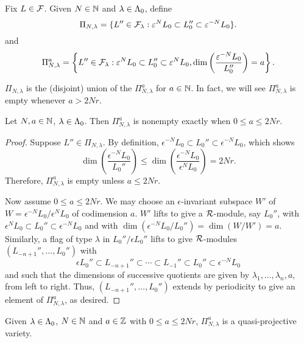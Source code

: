 \documentclass[a4paper, 11pt]{report}
\begin{document}
Fix $L\in\mathcal{F}$. Given $N\in\mathbb{N}$ and $\lambda\in{\Lambda_0}$, define
\begin{equation*}
\Pi_{N,\lambda} = \{L''\in\mathcal{F}_\lambda: \varepsilon^N L_0\subset L_0''\subset \varepsilon^{-N}L_0\}.
\end{equation*}
and
\begin{equation*}
\Pi_{N,\lambda}^a = \left\{L''\in\mathcal{F}_\lambda: \varepsilon^N L_0\subset L_0''\subset \varepsilon^{N}L_0, \dim\left(\frac{\varepsilon^{-N}L_0}{L_0''}\right) = a\right\}.
\end{equation*}

$\Pi_{N,\lambda}$ is the (disjoint) union of the $\Pi_{N,\lambda}^a$ for $a\in\mathbb{N}$. In fact, we will see $\Pi_{N,\lambda}^a$ is empty whenever $a > 2Nr$.

\begin{lemma}
Let $N,a\in\mathbb{N}$, $\lambda\in{\Lambda_0}$. Then $\Pi_{N,\lambda}
^a$ is nonempty exactly when $0\le a \le 2Nr$.
\end{lemma}

\begin{proof}
Suppose $L''\in\Pi_{N,\lambda}$. By definition, $\epsilon^{-N}L_0\subset L_0''\subset \epsilon^{-N}L_0$, which shows
\begin{equation*}
\dim\left(\frac{\epsilon^{-N}L_0}{L_0''}\right) \le \dim\left(\frac{\epsilon^{-N}L_0}{\epsilon^N L_0}\right) = 2Nr.
\end{equation*}
Therefore, $\Pi_{N,\lambda}^a$ is empty unless $a\le 2Nr$.

Now assume $0\le a\le 2Nr$. We may choose an $\epsilon$-invariant subspace $W'$ of $W = \epsilon^{-N}L_0/{\epsilon^N L_0}$ of codimension $a$. $W'$ lifts to give a $\mathcal{R}$-module, say $L_0''$, with $\epsilon^N L_0\subset L_0''\subset \epsilon^{-N}L_0$ and with $\dim(\epsilon^{-N}L_0/{L_0''}) = \dim(W/W') = a$. Similarly, a flag of type $\lambda$ in $L_0''/{\epsilon L_0''}$ lifts to give $\mathcal{R}$-modules $(L_{-n+1}'',\ldots,L_0'')$ with
\begin{equation*}
\epsilon L_0''\subset L_{-n+1}''\subset\cdots\subset L_{-1}''\subset L_0''\subset \epsilon^{-N}L_0
\end{equation*}
and such that the dimensions of successive quotients are given by $\lambda_1,\ldots,\lambda_n,a$, from left to right. Thus, $(L_{-n+1}'',\ldots,L_0'')$ extends by periodicity to give an element of $\Pi_{N,\lambda}^a$, as desired.
\end{proof}

\begin{lemma}
Given $\lambda\in{\Lambda_0}$, $N\in\mathbb{N}$ and $a\in\mathbb{Z}$ with $0\le a\le 2Nr$,
$\Pi_{N,\lambda}^a$ is a quasi-projective variety.
\end{lemma}
\end{document}

